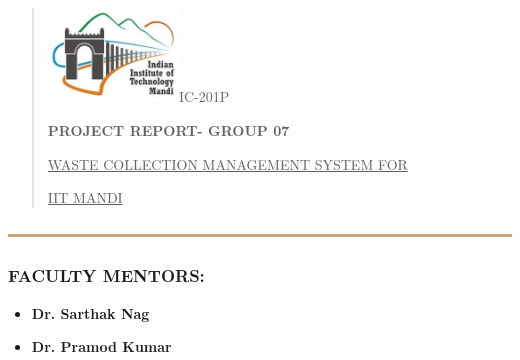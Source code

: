 \documentclass[
]{article}
\author{}
\date{}
\begin{document}
\begin{quote}
\includegraphics[width=1.36597in,height=0.98264in]{vertopal_24f0430788374a81b8d4c0bb6e5080ec/media/image1.jpeg}IC-201P

\textbf{PROJECT REPORT- GROUP 07}

\uline{WASTE COLLECTION MANAGEMENT SYSTEM FOR}

\uline{IIT MANDI}
\end{quote}

\includegraphics[width=6.5in,height=\textheight]{vertopal_24f0430788374a81b8d4c0bb6e5080ec/media/image2.png}

\hypertarget{faculty-mentors}{%
\subsubsection{\texorpdfstring{ \textbf{FACULTY
MENTORS:}}{ FACULTY MENTORS:}}\label{faculty-mentors}}

\begin{itemize}
\item
  \textbf{Dr. Sarthak Nag}
\item
  \textbf{Dr. Pramod Kumar}
\end{itemize}
\end{document}
